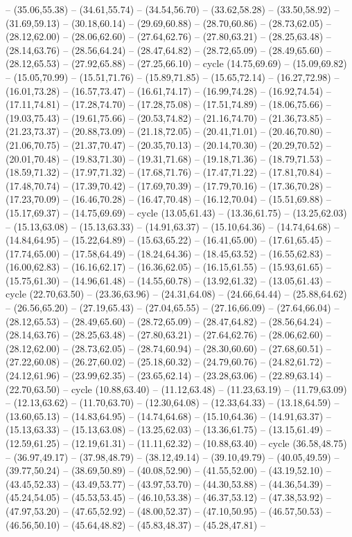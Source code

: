 {-- (35.06,55.38) -- (34.61,55.74) -- (34.54,56.70) -- (33.62,58.28) -- (33.50,58.92) -- (31.69,59.13) -- (30.18,60.14) -- (29.69,60.88) -- (28.70,60.86) -- (28.73,62.05) -- (28.12,62.00) -- (28.06,62.60) -- (27.64,62.76) -- (27.80,63.21) -- (28.25,63.48) -- (28.14,63.76) -- (28.56,64.24) -- (28.47,64.82) -- (28.72,65.09) -- (28.49,65.60) -- (28.12,65.53) -- (27.92,65.88) -- (27.25,66.10) -- cycle (14.75,69.69) -- (15.09,69.82) -- (15.05,70.99) -- (15.51,71.76) -- (15.89,71.85) -- (15.65,72.14) -- (16.27,72.98) -- (16.01,73.28) -- (16.57,73.47) -- (16.61,74.17) -- (16.99,74.28) -- (16.92,74.54) -- (17.11,74.81) -- (17.28,74.70) -- (17.28,75.08) -- (17.51,74.89) -- (18.06,75.66) -- (19.03,75.43) -- (19.61,75.66) -- (20.53,74.82) -- (21.16,74.70) -- (21.36,73.85) -- (21.23,73.37) -- (20.88,73.09) -- (21.18,72.05) -- (20.41,71.01) -- (20.46,70.80) -- (21.06,70.75) -- (21.37,70.47) -- (20.35,70.13) -- (20.14,70.30) -- (20.29,70.52) -- (20.01,70.48) -- (19.83,71.30) -- (19.31,71.68) -- (19.18,71.36) -- (18.79,71.53) -- (18.59,71.32) -- (17.97,71.32) -- (17.68,71.76) -- (17.47,71.22) -- (17.81,70.84) -- (17.48,70.74) -- (17.39,70.42) -- (17.69,70.39) -- (17.79,70.16) -- (17.36,70.28) -- (17.23,70.09) -- (16.46,70.28) -- (16.47,70.48) -- (16.12,70.04) -- (15.51,69.88) -- (15.17,69.37) -- (14.75,69.69) -- cycle (13.05,61.43) -- (13.36,61.75) -- (13.25,62.03) -- (15.13,63.08) -- (15.13,63.33) -- (14.91,63.37) -- (15.10,64.36) -- (14.74,64.68) -- (14.84,64.95) -- (15.22,64.89) -- (15.63,65.22) -- (16.41,65.00) -- (17.61,65.45) -- (17.74,65.00) -- (17.58,64.49) -- (18.24,64.36) -- (18.45,63.52) -- (16.55,62.83) -- (16.00,62.83) -- (16.16,62.17) -- (16.36,62.05) -- (16.15,61.55) -- (15.93,61.65) -- (15.75,61.30) -- (14.96,61.48) -- (14.55,60.78) -- (13.92,61.32) -- (13.05,61.43) -- cycle (22.70,63.50) -- (23.36,63.96) -- (24.31,64.08) -- (24.66,64.44) -- (25.88,64.62) -- (26.56,65.20) -- (27.19,65.43) -- (27.04,65.55) -- (27.16,66.09) -- (27.64,66.04) -- (28.12,65.53) -- (28.49,65.60) -- (28.72,65.09) -- (28.47,64.82) -- (28.56,64.24) -- (28.14,63.76) -- (28.25,63.48) -- (27.80,63.21) -- (27.64,62.76) -- (28.06,62.60) -- (28.12,62.00) -- (28.73,62.05) -- (28.74,60.94) -- (28.30,60.60) -- (27.68,60.51) -- (27.22,60.08) -- (26.27,60.02) -- (25.18,60.32) -- (24.79,60.76) -- (24.82,61.72) -- (24.12,61.96) -- (23.99,62.35) -- (23.65,62.14) -- (23.28,63.06) -- (22.89,63.14) -- (22.70,63.50) -- cycle (10.88,63.40) -- (11.12,63.48) -- (11.23,63.19) -- (11.79,63.09) -- (12.13,63.62) -- (11.70,63.70) -- (12.30,64.08) -- (12.33,64.33) -- (13.18,64.59) -- (13.60,65.13) -- (14.83,64.95) -- (14.74,64.68) -- (15.10,64.36) -- (14.91,63.37) -- (15.13,63.33) -- (15.13,63.08) -- (13.25,62.03) -- (13.36,61.75) -- (13.15,61.49) -- (12.59,61.25) -- (12.19,61.31) -- (11.11,62.32) -- (10.88,63.40) -- cycle (36.58,48.75) -- (36.97,49.17) -- (37.98,48.79) -- (38.12,49.14) -- (39.10,49.79) -- (40.05,49.59) -- (39.77,50.24) -- (38.69,50.89) -- (40.08,52.90) -- (41.55,52.00) -- (43.19,52.10) -- (43.45,52.33) -- (43.49,53.77) -- (43.97,53.70) -- (44.30,53.88) -- (44.36,54.39) -- (45.24,54.05) -- (45.53,53.45) -- (46.10,53.38) -- (46.37,53.12) -- (47.38,53.92) -- (47.97,53.20) -- (47.65,52.92) -- (48.00,52.37) -- (47.10,50.95) -- (46.57,50.53) -- (46.56,50.10) -- (45.64,48.82) -- (45.83,48.37) -- (45.28,47.81) -- }
